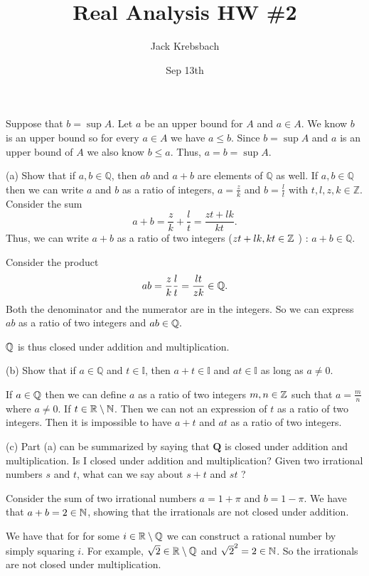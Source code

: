 \documentclass{report}
\title{Real Analysis HW \#2}
\author{Jack Krebsbach }
\date{Sep 13th}
\begin{document}
\maketitle


\begin{myproof}
Suppose that $b = \sup A$. Let $a$ be an upper bound for $A$ and $a \in A$. We know $b$ is an upper bound so for every $a \in A$ we have $a \leq b.$ Since $b = \sup A$ and $a$ is an upper bound of $A$ we also know $b \leq a$. Thus, $a = b = \sup A.$
\end{myproof}


(a) Show that if $a, b \in \mathbb{Q}$, then $a b$ and $a+b$ are elements of $\mathbb{Q}$ as well.
\sol If  $a, b \in \mathbb{Q}$ then we can write $a$ and $b$ as a ratio of integers, $a = \frac{z}{k}$ and $b= \frac{l}{t}$ with $t,l,z,k \in \mathbb{Z}.$ Consider the sum $$
a+b = \frac{z}{k} + \frac{l}{t}= \frac{zt + lk}{kt}. 
$$
Thus, we can write $a+b$ as a ratio of two integers ($zt+lk,kt \in \ZZ$ ) : $a+b \in \mathbb{Q}$.
\par \bigskip

Consider the product
$$ab = \frac{z}{k} \frac{l}{t} = \frac{lt}{zk} \in \QQ.$$ Both the denominator and the numerator are in the integers. So we can express $ab$ as a ratio of two integers and $ab \in \QQ.$
\par 
$\QQ$ is thus closed under addition and multiplication.
\par 
\bigskip
(b) Show that if $a \in \mathbb{Q}$ and $t \in \mathbb{I}$, then $a+t \in \mathbb{I}$ and $a t \in \mathbb{I}$ as long as $a \neq 0$.

\sol If $a \in \QQ$ then we can define $a$ as a ratio of two integers $m,n \in \ZZ$ such that $a = \frac{m}{n}$ where $a \neq 0$. If $t \in \RR \setminus \NN$. Then we can not an expression of $t$ as a ratio of two integers. Then it is impossible to have $a+t$ and $at$ as a ratio of two integers.  

\par \bigskip
(c) Part (a) can be summarized by saying that $\mathbf{Q}$ is closed under addition and multiplication. Is I closed under addition and multiplication? Given two irrational numbers $s$ and $t$, what can we say about $s+t$ and $s t$ ?
\smallskip
\par
\sol 
Consider the sum of two irrational numbers $a = 1 + \pi$ and $b = 1 - \pi.$ We have that $a + b = 2 \in \NN$, showing that the irrationals are not closed under addition.
\par
We have that for for some  $i \in \RR \setminus \QQ$ we can construct a rational number by simply squaring $i.$ For example, $\sqrt{2} \in \RR \setminus \QQ$ and $\sqrt{2}^2= 2 \in \NN$. So the irrationals are not closed under multiplication.
\end{document}
